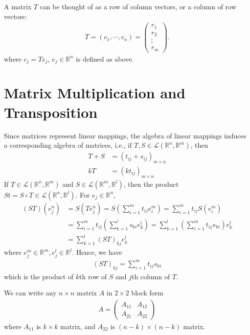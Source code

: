\documentclass[11pt]{book}
\theoremstyle{definition}
\numberwithin{equation}{chapter}
\begin{document}
A matrix $T$ can be thought of as a row of column vectors, or a column of row vectors: 
\begin{align*}
    T = (c_1,\cdots,c_n) = \left(
    \begin{matrix}
        r_1 \\
        r_2 \\
        \vdots \\
        r_m 
        \end{matrix}
    \right).
\end{align*}
where $c_j = T e_j$, $e_j\in\mathbb{R}^n$ is defined as above.

\medskip
\section{Matrix Multiplication and Transposition}
Since matrices represent linear mappings, the algebra of linear mappings induces a corresponding algebra of matrices, i.e., if $T,S\in \mathscr{L}(\mathbb{R}^n,\mathbb{R}^m)$, then
\begin{align*}
    T+S &= (t_{ij} + s_{ij})_{m\times n}\\
    k T &= (kt_{ij})_{m\times n}
\end{align*}
If $T\in \mathscr{L}(\mathbb{R}^n,\mathbb{R}^m)$ and $S\in \mathscr{L}(\mathbb{R}^m,\mathbb{R}^l)$, then the product $St = S\circ T \in \mathscr{L}(\mathbb{R}^n,\mathbb{R}^l)$. For $e_j\in\mathbb{R}^n$,
\begin{align*}
    (ST)(e_j^n) & = S(Te_j^n) = S\left(\sum^m_{i=1}t_{ij}e^m_i\right) = \sum^m_{i=1}t_{ij} S(e^m_i) \\
    & = \sum^m_{i=1}t_{ij} \left(\sum^l_{k=1}s_{ki}e^l_k\right) = \sum^l_{k=1}\left(\sum^m_{i=1}t_{ij}s_{ki}\right)e^l_k \\
    & = \sum^l_{k=1}(ST)_{kj} e^l_k
\end{align*}
where $e_j^m\in\mathbb{R}^m,e_j^l\in\mathbb{R}^l$. Hence, we have 
\begin{align*}
    (ST)_{kj} = \sum^m_{i=1}t_{ij}s_{ki}
\end{align*}
which is the product of $k$th row of $S$ and $j$th column of $T$.

We can write any $n\times n$ matrix $A$ in $2\times 2$ block form
\begin{align*}
    A = \left(
        \begin{matrix}
        A_{11} & A_{12} \\
        A_{21} & A_{22} 
        \end{matrix}
    \right)
\end{align*}
where $A_{11}$ is $k\times k$ matrix, and $A_{22}$ is $(n-k)\times(n-k)$ matrix. 
\end{document}
